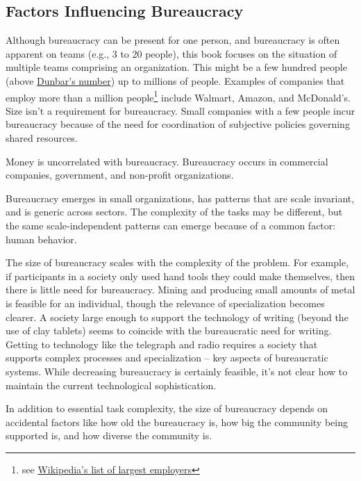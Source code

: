\subsection*{Factors Influencing Bureaucracy}

Although bureaucracy can be present for one person, and bureaucracy is often apparent on teams (e.g., 3 to 20 people), this book focuses on the situation of multiple teams comprising an organization. This might be a few hundred people (above \href{https://en.wikipedia.org/wiki/Dunbar's_number}{Dunbar's number}) up to millions of people. 
Examples of companies that employ more than a million people\footnote{see \href{https://en.wikipedia.org/wiki/List_of_largest_employers}{Wikipedia's list of largest employers}} include Walmart, Amazon, and McDonald's. Size isn't a requirement for bureaucracy. Small companies with a few people incur bureaucracy because of the need for coordination of subjective policies governing shared resources. 

Money is uncorrelated with bureaucracy. Bureaucracy occurs in commercial companies, government, and non-profit organizations.

Bureaucracy emerges in small organizations, has patterns that are scale invariant, and is generic across sectors. The complexity of the tasks may be different, but the same scale-independent patterns can emerge because of a common factor: human behavior.

The size of bureaucracy scales with the complexity of the problem. For example, if participants in a society only used hand tools they could make themselves, then there is little need for bureaucracy. Mining and producing small amounts of metal is feasible for an individual, though the relevance of specialization becomes clearer. A society large enough to support the technology of writing (beyond the use of clay tablets) seems to coincide with the bureaucratic need for writing. Getting to technology like the telegraph and radio requires a society that supports complex processes and specialization -- key aspects of bureaucratic systems. While decreasing bureaucracy is certainly feasible, it's not clear how to maintain the current technological sophistication. 


In addition to essential task complexity, the size of bureaucracy depends on accidental factors like how old the bureaucracy is, how big the community being supported is, and how diverse the community is.


